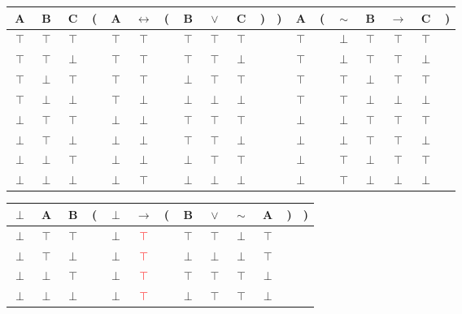 \documentclass[11pt]{article}
\begin{document}
\begin{tabular}{ c  c  c | c  c  c  c  c  c  c  c  c | c | c  c  c  c  c  c }
A & B & C & ( & A & $\leftrightarrow$ & ( & B & $\lor$ & C & ) & ) & A & ( & $\sim$ & B & $\rightarrow$ & C & )\\
\hline 
$\top$ & $\top$ & $\top$ &  & $\top$ & $\top$ &  & $\top$ & $\top$ & $\top$ &  &  & $\top$ &  & $\perp$ & $\top$ & $\top$ & $\top$ & \\
$\top$ & $\top$ & $\perp$ &  & $\top$ & $\top$ &  & $\top$ & $\top$ & $\perp$ &  &  & $\top$ &  & $\perp$ & $\top$ & $\top$ & $\perp$ & \\
$\top$ & $\perp$ & $\top$ &  & $\top$ & $\top$ &  & $\perp$ & $\top$ & $\top$ &  &  & $\top$ &  & $\top$ & $\perp$ & $\top$ & $\top$ & \\
$\top$ & $\perp$ & $\perp$ &  & $\top$ & $\perp$ &  & $\perp$ & $\perp$ & $\perp$ &  &  & $\top$ &  & $\top$ & $\perp$ & $\perp$ & $\perp$ & \\
$\perp$ & $\top$ & $\top$ &  & $\perp$ & $\perp$ &  & $\top$ & $\top$ & $\top$ &  &  & $\perp$ &  & $\perp$ & $\top$ & $\top$ & $\top$ & \\
$\perp$ & $\top$ & $\perp$ &  & $\perp$ & $\perp$ &  & $\top$ & $\top$ & $\perp$ &  &  & $\perp$ &  & $\perp$ & $\top$ & $\top$ & $\perp$ & \\
$\perp$ & $\perp$ & $\top$ &  & $\perp$ & $\perp$ &  & $\perp$ & $\top$ & $\top$ &  &  & $\perp$ &  & $\top$ & $\perp$ & $\top$ & $\top$ & \\
$\perp$ & $\perp$ & $\perp$ &  & $\perp$ & $\top$ &  & $\perp$ & $\perp$ & $\perp$ &  &  & $\perp$ &  & $\top$ & $\perp$ & $\perp$ & $\perp$ & \\
\end{tabular}


\vspace{2em}


\begin{tabular}{ c  c  c | c  c  c  c  c  c  c  c  c  c }
$\perp$ & A & B & ( & $\perp$ & $\rightarrow$ & ( & B & $\lor$ & $\sim$ & A & ) & )\\
\hline 
$\perp$ & $\top$ & $\top$ &  & $\perp$ & \textcolor{red}{$\top$} &  & $\top$ & $\top$ & $\perp$ & $\top$ &  & \\
$\perp$ & $\top$ & $\perp$ &  & $\perp$ & \textcolor{red}{$\top$} &  & $\perp$ & $\perp$ & $\perp$ & $\top$ &  & \\
$\perp$ & $\perp$ & $\top$ &  & $\perp$ & \textcolor{red}{$\top$} &  & $\top$ & $\top$ & $\top$ & $\perp$ &  & \\
$\perp$ & $\perp$ & $\perp$ &  & $\perp$ & \textcolor{red}{$\top$} &  & $\perp$ & $\top$ & $\top$ & $\perp$ &  & \\
\end{tabular}
\end{document}
